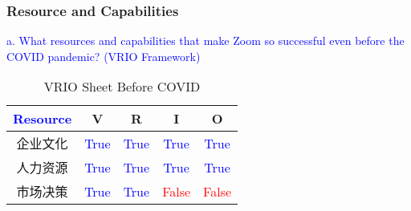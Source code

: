 \documentclass{beamer}
\begin{document}
\begin{frame}[allowframebreaks]
\frametitle{Resource and Capabilities}
\textcolor{blue}{a. What resources and capabilities that make Zoom so successful even before the COVID pandemic? (VRIO Framework)}
\begin{table}
\begin{tabular}{c c c c c}
\toprule
\textcolor{blue}{\textbf{Resource}} & \textbf{V} & \textbf{R} & \textbf{I} & \textbf{O} \\
\midrule
企业文化  & \textcolor{blue}{True} & \textcolor{blue}{True} & \textcolor{blue}{True} & \textcolor{blue}{True}\\
人力资源 & \textcolor{blue}{True} & \textcolor{blue}{True} & \textcolor{blue}{True} & \textcolor{blue}{True}\\
市场决策 & \textcolor{blue}{True} & \textcolor{blue}{True} & \textcolor{red}{False} & \textcolor{red}{False}\\
\bottomrule
\end{tabular}
\caption{VRIO Sheet Before COVID}
\end{table}




\end{frame}
\end{document}
